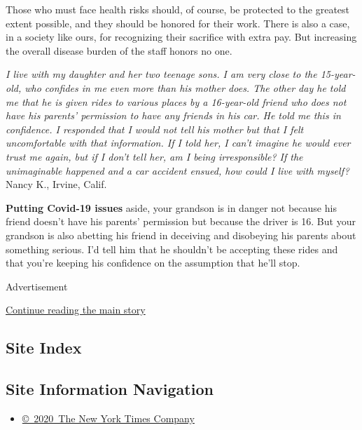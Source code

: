 Those who must face health risks should, of course, be protected to the
greatest extent possible, and they should be honored for their work.
There is also a case, in a society like ours, for recognizing their
sacrifice with extra pay. But increasing the overall disease burden of
the staff honors no one.

\emph{I live with my daughter and her two teenage sons. I am very close
to the 15-year-old, who confides in me even more than his mother does.
The other day he told me that he is given rides to various places by a
16-year-old friend who does not have his parents' permission to have any
friends in his car. He told me this in confidence. I responded that I
would not tell his mother but that I felt uncomfortable with that
information. If I told her, I can't imagine he would ever trust me
again, but if I don't tell her, am I being irresponsible? If the
unimaginable happened and a car accident ensued, how could I live with
myself?} Nancy K., Irvine, Calif.

\textbf{Putting Covid-19 issues} aside, your grandson is in danger not
because his friend doesn't have his parents' permission but because the
driver is 16. But your grandson is also abetting his friend in deceiving
and disobeying his parents about something serious. I'd tell him that he
shouldn't be accepting these rides and that you're keeping his
confidence on the assumption that he'll stop.

Advertisement

\protect\hyperlink{after-bottom}{Continue reading the main story}

\hypertarget{site-index}{%
\subsection{Site Index}\label{site-index}}

\hypertarget{site-information-navigation}{%
\subsection{Site Information
Navigation}\label{site-information-navigation}}

\begin{itemize}
\tightlist
\item
  \href{https://help.nytimes3xbfgragh.onion/hc/en-us/articles/115014792127-Copyright-notice}{©~2020~The
  New York Times Company}
\end{itemize}

